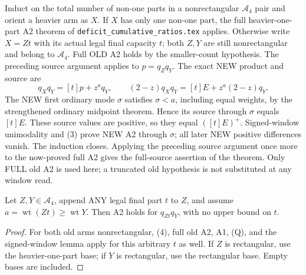 Induct on the total number of non-one parts in a nonrectangular
$\mathcal A_4$ pair and orient a heavier arm as $X$.
If $X$ has only one non-one part, the full heavier-one-part A2
theorem of \texttt{deficit\_cumulative\_ratios.tex} applies.
Otherwise write $X=Zt$ with its actual legal final capacity $t$;
both $Z,Y$ are still
nonrectangular and belong to $\mathcal A_4$. Full OLD A2 holds by
the smaller-count hypothesis. The preceding source argument applies
to $p=q_Zq_Y$. The exact NEW product and source are
\[
 q_Xq_Y=[t]p+z^a q_Y,\qquad
 (2-z)q_Xq_Y=[t]E+z^a(2-z)q_Y.                 \tag{4}
\]
The NEW first ordinary mode $\sigma$ satisfies $\sigma<a$,
including equal weights, by the strengthened ordinary midpoint
theorem. Hence its source through $\sigma$ equals $[t]E$.
These source values are positive, so they equal $([t]E)^+$.
Signed-window unimodality and (3) prove NEW A2 through $\sigma$;
all later NEW positive differences vanish. The induction closes.
Applying the preceding source argument once more to the now-proved
full A2 gives the full-source assertion of the theorem.
Only FULL old A2 is used here; a truncated old hypothesis is not
substituted at any window read.

\begin{corollary}
Let $Z,Y\in\mathcal A_4$, append ANY legal final part $t$ to $Z$,
and assume $a=\operatorname{wt}(Zt)\ge\operatorname{wt}Y$.
Then A2 holds for $q_{Zt}q_Y$, with no upper bound on $t$.
\end{corollary}
\begin{proof}
For both old arms nonrectangular, (4), full old A2, A1, (Q), and
the signed-window lemma apply for this arbitrary $t$ as well.
If $Z$ is rectangular, use the heavier-one-part base; if $Y$ is
rectangular, use the rectangular base. Empty bases are included.
\end{proof}

